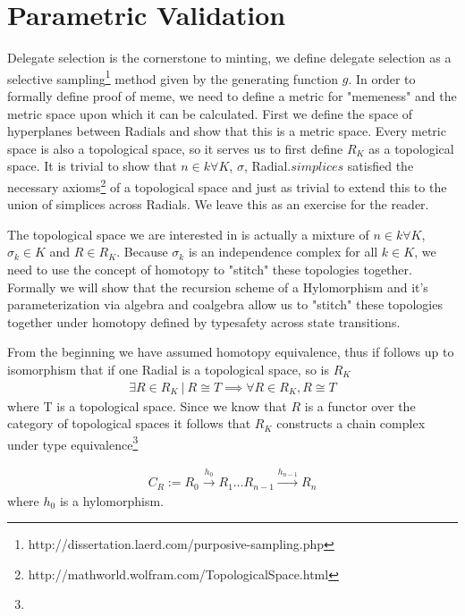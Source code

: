 \documentclass{article}
\begin{document}
\section{Parametric Validation}
Delegate selection is the cornerstone to minting, we define delegate selection as a selective sampling\footnote{http://dissertation.laerd.com/purposive-sampling.php} method given by the generating function $g$. In order to formally define proof of meme, we need to define a metric for "memeness" and the metric space upon which it can be calculated. First we define the space of hyperplanes between Radials and show that this is a metric space. Every metric space is also a topological space, so it serves us to first define $R_K$ as a topological space. It is trivial to show that $n \in k \forall K$, $\sigma$, Radial.$simplices$ satisfied the necessary axioms\footnote{http://mathworld.wolfram.com/TopologicalSpace.html} of a topological space and just as trivial to extend this to the union of simplices across Radials. We leave this as an exercise for the reader. 

The topological space we are interested in is actually a mixture of $n \in k \forall K$, $\sigma_k \in K$ and $R \in R_K$. Because $\sigma_k$ is an independence complex for all $k \in K$, we need to use the concept of homotopy to "stitch" these topologies together. Formally we will show that the recursion scheme of a Hylomorphism and it's parameterization via algebra and coalgebra allow us to "stitch" these topologies together under homotopy defined by typesafety across state transitions.

From the beginning we have assumed homotopy equivalence, thus if follows up to isomorphism that if one Radial is a topological space, so is $R_K$
\begin{equation} \label{eq1}
\begin{split}
\exists R \in R_K \ | \ R \cong T \implies \forall R \in R_K,  R \cong T
\end{split}
\end{equation}
where T is a topological space. Since we know that $R$ is a functor over the category of topological spaces it follows that $R_K$ constructs a chain complex under type equivalence\footnote{}

\begin{equation} \label{eq1}
\begin{split}
C_R := R_{0}{\xrightarrow {h_{0}}}R_{1} \dots R_{n-1}{\xrightarrow {h_{n-1}}}R_{n}
\end{split}
\end{equation}
where $h_{0}$ is a hylomorphism.
\end{document}
